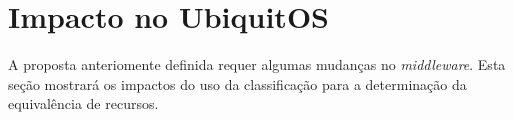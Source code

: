 \section{Impacto no UbiquitOS}

A proposta anteriomente definida requer algumas mudanças no \emph{middleware}. Esta seção mostrará os impactos do uso da classificação para a determinação da equivalência de recursos.




